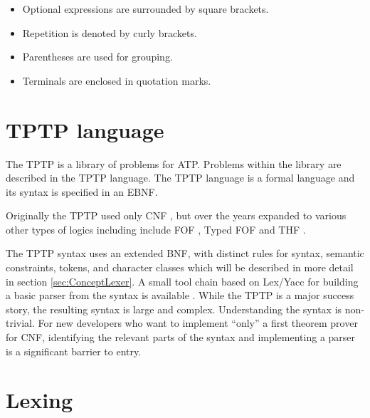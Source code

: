 \begin{itemize}%
	\item Optional expressions are surrounded by square brackets.
	\item Repetition is denoted by curly brackets.
	\item Parentheses are used for grouping.
	\item Terminals are enclosed in quotation marks.
\end{itemize}
\label{itemize:BackgroundBNF}
\cite{EBNF.1977}

\section{TPTP language}\label{sec:BackgroundTPTP}

The \acf{TPTP} is a library of problems for \ac{ATP}.
Problems within the library are described in the \ac{TPTP} language.
The  \ac{TPTP} language is a formal language and its syntax is specified in an \ac{EBNF}. \cite{Sut17}

Originally the \ac{TPTP} used only \ac{CNF} \cite{Sut09}, but over the
years expanded to various other types of logics including
include \ac{FOF} \cite{Sut09}, Typed \ac{FOF} \cite{SS+12, BP:CADE-2013} and \ac{THF} \cite{SB10, KSR:PAAR-2016}.

The TPTP syntax uses an extended \ac{BNF}, with distinct rules for syntax, semantic constraints, tokens, and character classes which will be described in more detail in section \ref{sec:ConceptLexer}.
A small tool chain based on Lex/Yacc for building a basic parser from the syntax is available \cite{VS06}.
While the TPTP is a major success story, the resulting syntax is large and complex.
Understanding the syntax is non-trivial.
For new developers who want to implement ``only'' a first theorem prover for \ac{CNF}, identifying the relevant parts of the syntax and implementing a parser is a significant barrier to entry.


\section{Lexing}\label{sec:BackgroundLexer}

